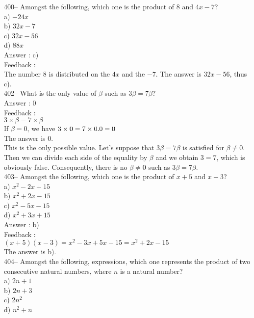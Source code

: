 ﻿\documentclass[letterpaper, 12pt]{article}
\begin{document}
400-- Amongst the following, which one is the product of 8 and
$4x-7$?\\
a) $-24x$\\
b) $32x-7$\\
c) $32x-56$\\
d) $88x$\\

Answer : c)\\

Feedback : \\
The number 8 is distributed on the $4x$ and the $-7$. The answer is $32x-56$, thus c).\\


402-- What is the only value of $\beta$ such as $3\beta=7\beta$?\\

Answer : 0 \\

Feedback : \\
$3\times \beta = 7 \times \beta $\\
If $\beta=0$, we have $3\times0=7\times 0.\\
0=0$\\
The answer is 0.\\

This is the only possible value. Let's suppose that $3\beta=7\beta$ is satisfied for $\beta\neq0$. Then we can divide each side of the equality by $\beta$ and we obtain $3=7$, which is obviously false. Consequently, there is no $\beta\neq0$ such as $3\beta=7\beta$.\\

403-- Amongst the following, which one is the product of $x+5$ and
$x-3$?\\
a) $x^{2}-2x+15$ \\
b) $x^{2}+2x-15$\\
c) $x^{2}-5x-15$\\
d) $x^{2}+3x+15$\\

Answer : b)\\

Feedback : \\
$\left( x+5\right) \left( x-3\right)=x^{2}-3x+5x-15=x^{2}+2x-15$\\
The answer is b).\\

404-- Amongst the following, expressions, which one represents the product of two consecutive natural numbers, where $n$ is a natural number?\\
a) $2n+1$\\
b) $2n+3$ \\
c) $2n^{2}$\\
d) $n^{2}+n$\\
\end{document}
